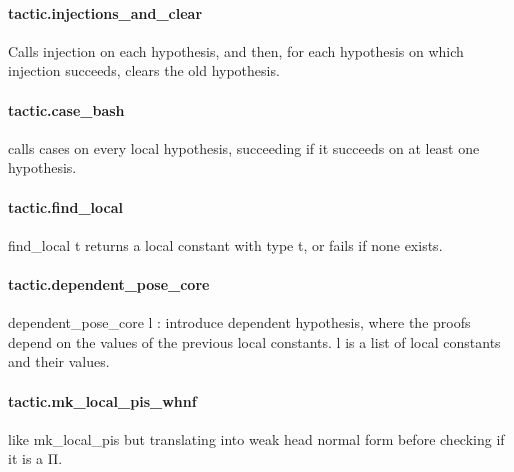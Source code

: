 \documentclass{article}
\begin{document}
\paragraph{tactic.injections\_and\_clear}
\par
Calls 
\colorbox[RGB]{253,246,227}{{{{\color[RGB]{101, 123, 131} injection }}}} on each hypothesis, and then, for each hypothesis on which 
\colorbox[RGB]{253,246,227}{{{{\color[RGB]{101, 123, 131} injection }}}}succeeds, clears the old hypothesis.
\paragraph{tactic.case\_bash}
\par
calls 
\colorbox[RGB]{253,246,227}{{{{\color[RGB]{101, 123, 131} cases }}}} on every local hypothesis, succeeding if
it succeeds on at least one hypothesis.
\paragraph{tactic.find\_local}
\par
\colorbox[RGB]{253,246,227}{{{{\color[RGB]{101, 123, 131} find\_local t }}}} returns a local constant with type t, or fails if none exists.
\paragraph{tactic.dependent\_pose\_core}
\par
\colorbox[RGB]{253,246,227}{{{{\color[RGB]{101, 123, 131} dependent\_pose\_core l }}}}: introduce dependent hypothesis, where the proofs depend on the values
of the previous local constants. 
\colorbox[RGB]{253,246,227}{{{{\color[RGB]{101, 123, 131} l }}}} is a list of local constants and their values.
\paragraph{tactic.mk\_local\_pis\_whnf}
\par
like 
\colorbox[RGB]{253,246,227}{{{{\color[RGB]{101, 123, 131} mk\_local\_pis }}}} but translating into weak head normal form before checking if it is a Π.
\end{document}
